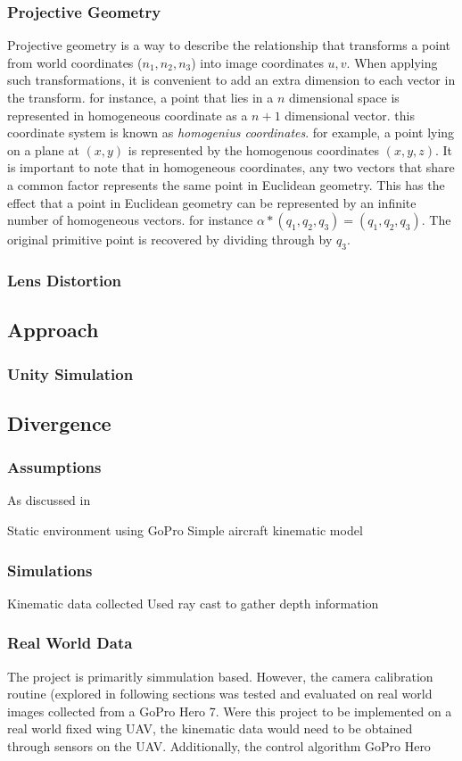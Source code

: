 \documentclass{UoNMCHA}
\numberwithin{equation}{section}
\begin{document}
\subsubsection{Projective Geometry}
Projective geometry is a way to describe the relationship that transforms a point from world coordinates ($n_1, n_2, n_3$) into image coordinates {$u, v$}. When applying such transformations, it is convenient to add an extra dimension to each vector in the transform. for instance, a point that lies in a $n$ dimensional space is represented in homogeneous coordinate as a $n+1$ dimensional vector. this coordinate system is known as \textit{homogenius coordinates}. for example, a point lying on a plane at $(x, y)$ is represented by the homogenous coordinates $(x, y, z)$. It is important to note that in homogeneous coordinates, any two vectors that share a common factor represents the same point in Euclidean geometry. This has the effect that a point in Euclidean geometry can be represented by an infinite number of homogeneous vectors. for instance $\alpha * (q_{1}, q_{2}, q_{3}) = (q_{1}, q_{2}, q_{3})$. The original primitive point is recovered by dividing through by $q_{3}$.


\subsubsection{Lens Distortion}
 
\subsection{Approach}
\subsubsection{Unity Simulation}
\subsection{Divergence}
\subsubsection{Assumptions}
As discussed in 

Static environment
using GoPro
Simple aircraft kinematic model
\subsubsection{Simulations}
Kinematic data collected
Used ray cast to gather depth information
\subsubsection{Real World Data}
The project is primaritly simmulation based. However, the camera calibration routine (explored in following sections was tested and evaluated on real world images collected from a GoPro Hero 7. Were this project to be implemented on a real world fixed wing UAV, the kinematic data would need to be obtained through sensors on the UAV. Additionally, the control algorithm
GoPro Hero
\newpage
\end{document}
